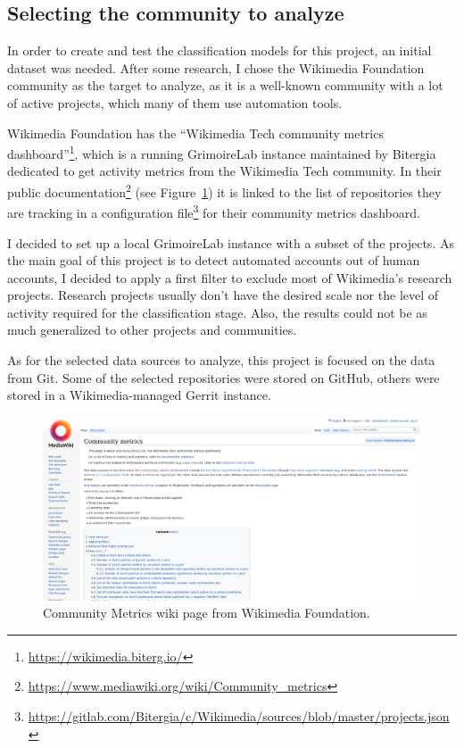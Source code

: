 \documentclass[a4paper, 12pt]{book}
\begin{document}
\subsection{Selecting the community to analyze}
\label{ssec:selecting-community}
In order to create and test the classification models for this project, an initial dataset was needed. After some research, I chose the Wikimedia Foundation community as the target to analyze, as it is a well-known community with a lot of active projects, which many of them use automation tools. 

Wikimedia Foundation has the ``Wikimedia Tech community metrics dashboard''\footnote{\url{https://wikimedia.biterg.io/}}, which is a running GrimoireLab instance maintained by Bitergia dedicated to get activity metrics from the Wikimedia Tech community. In their public documentation\footnote{\url{https://www.mediawiki.org/wiki/Community_metrics}} (see Figure~\ref{fig:wikimedia-wiki}) it is linked to the list of repositories they are tracking in a configuration file\footnote{\url{https://gitlab.com/Bitergia/c/Wikimedia/sources/blob/master/projects.json}} for their community metrics dashboard.

I decided to set up a local GrimoireLab instance with a subset of the projects. As the main goal of this project is to detect automated accounts out of human accounts, I decided to apply a first filter to exclude most of Wikimedia's research projects. Research projects usually don't have the desired scale nor the level of activity required for the classification stage. Also, the results could not be as much generalized to other projects and communities.

As for the selected data sources to analyze, this project is focused on the data from Git. Some of the selected repositories were stored on GitHub, others were stored in a Wikimedia-managed Gerrit instance.

\begin{figure}
 \centering
  \includegraphics[width=15cm, keepaspectratio]{img/community-metrics-wiki.png}
  \caption{Community Metrics wiki page from Wikimedia Foundation.}
  \label{fig:wikimedia-wiki}
\end{figure}
\end{document}
